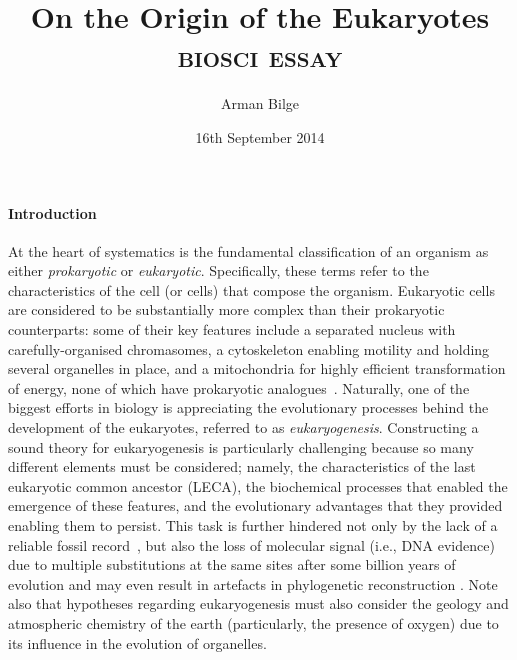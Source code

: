 \documentclass{article}
\title{On the Origin of the Eukaryotes \\
           \Large\textsc{biosci \oldstylenums{210} essay}}
\author{Arman Bilge}
\date{16th September 2014}
\begin{document}
    \maketitle

    \paragraph*{Introduction}
        At the heart of systematics is the fundamental classification of an
            organism as either \emph{prokaryotic} or \emph{eukaryotic}.
        Specifically, these terms refer to the characteristics of the cell (or
            cells) that compose the organism.
        Eukaryotic cells are considered to be substantially more complex than
            their prokaryotic counterparts: some of their key features include
            a separated nucleus with carefully-organised chromasomes,
            a cytoskeleton enabling motility and holding several organelles in
            place, and a mitochondria for highly efficient transformation of
            energy, none of which have prokaryotic
            analogues~\parencite{Duv07,Kat12}.
        Naturally, one of the biggest efforts in biology is appreciating the
            evolutionary processes behind the development of the eukaryotes,
            referred to as \emph{eukaryogenesis}.
        Constructing a sound theory for eukaryogenesis is particularly
            challenging because so many different elements must be
            considered; namely, the characteristics of the last eukaryotic
            common ancestor (LECA), the biochemical processes that enabled the
            emergence of these features, and the evolutionary advantages that
            they provided enabling them to persist.
        This task is further hindered not only by the lack of a reliable fossil
            record~\parencite{Sog91}, but also the loss of molecular signal
            (i.e., DNA evidence) due to multiple substitutions at the same
            sites after some billion years of evolution and may even result in
            artefacts in phylogenetic reconstruction \parencite{Gri+10,Wil+13}.
        Note also that hypotheses regarding eukaryogenesis must also consider
            the geology and atmospheric chemistry of the earth (particularly,
            the presence of oxygen) due to its influence in the evolution of
            organelles.
\end{document}
